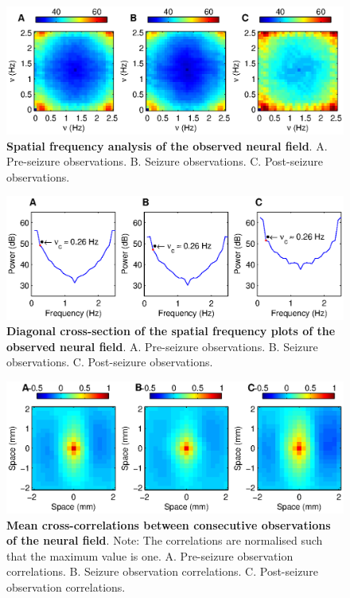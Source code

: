 \documentclass[]{article}
\begin{document}
\begin{figure}[!ht]
\begin{center}
\includegraphics{./Figures/SpatialFreq.eps}
\end{center}
\caption{{\bf Spatial frequency analysis of the observed neural field}. A. Pre-seizure observations. B. Seizure observations. C. Post-seizure observations.}
\label{fig:SpatialFreqObservation}
\end{figure}

\begin{figure}[!ht]
\begin{center}
\includegraphics{./Figures/SpatialFreqCrossSection.eps}
\end{center}
\caption{{\bf Diagonal cross-section of the spatial frequency plots of the observed neural field}. A. Pre-seizure observations. B. Seizure observations. C. Post-seizure observations.}
\label{fig:DiagSpatialFreqObservation}
\end{figure}

\begin{figure}[!ht]
\begin{center}
\includegraphics{./Figures/CrossCorr2D.eps}
\end{center}
\caption{{\bf Mean cross-correlations between consecutive observations of the neural field}. Note: The correlations are normalised such that the maximum value is one. A. Pre-seizure observation correlations. B. Seizure observation correlations. C. Post-seizure observation correlations.}
\label{fig:SpatialCrossCorrelation}
\end{figure}
\end{document}
